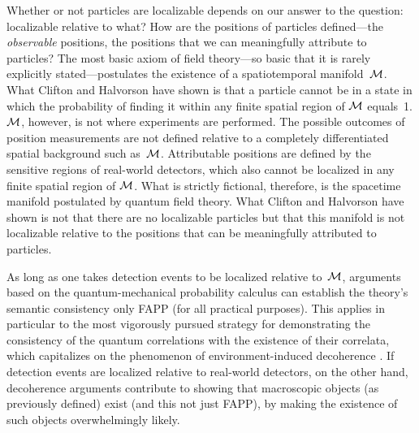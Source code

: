 Whether or not particles are localizable depends on our answer to the question: localizable relative to what? How are the positions of particles defined---the \emph{observable} positions, the positions that we can meaningfully attribute to particles? The most basic axiom of field theory---so basic that it is rarely explicitly stated---postulates the existence of a spatiotemporal manifold~$\cal M$. What Clifton and Halvorson have shown is that a particle cannot be in a state in which the probability of finding it within any finite spatial region of $\cal M$ equals~1. $\cal M$, however, is not where experiments are performed. The possible outcomes of position measurements are not defined relative to a completely differentiated spatial background such as~$\cal M$. Attributable positions are defined by the sensitive regions of real-world detectors, which also cannot be localized in any finite spatial region of $\cal M$. What is strictly fictional, therefore, is the spacetime manifold postulated by quantum field theory. What Clifton and Halvorson have shown is not that there are no localizable particles but that this manifold is not localizable relative to the positions that can be meaningfully attributed to particles. 

As long as one takes detection events to be localized relative to~$\cal M$,  arguments based on the quantum-mechanical probability calculus can establish the theory's semantic consistency only FAPP (for all practical purposes). This applies in particular to the most vigorously pursued strategy for demonstrating the consistency of the quantum correlations with the existence of their correlata, which capitalizes on the phenomenon of environment-induced decoherence \citep{Joosetal,Zurek,Schlosshauer2007}.  If detection events are localized relative to real-world detectors, on the other hand, decoherence arguments contribute to showing that macroscopic objects (as previously defined) exist (and this not just FAPP), by making the existence of such objects overwhelmingly likely.

